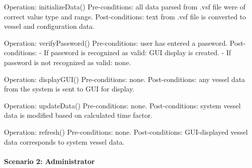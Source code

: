 \documentclass{article}
\begin{document}
Operation: initializeData()
Pre-conditions: all data parsed from .vsf file were of correct value type and range.
Post-conditions: text from .vsf file is converted to vessel and configuration data.

Operation: verifyPassword()
Pre-conditions: user has entered a password.
Post-conditions:
- If password is recognized as valid: GUI display is created.
- If password is not recognized as valid: none.

Operation: displayGUI()
Pre-conditions: none.
Post-conditions: any vessel data from the system is sent to GUI for display.

Operation: updateData()
Pre-conditions: none.
Post-conditions: system vessel data is modified based on calculated time factor.

Operation: refresh()
Pre-conditions: none.
Post-conditions: GUI-displayed vessel data corresponds to system vessel data.

\paragraph{Scenario 2: Administrator}
\end{document}
